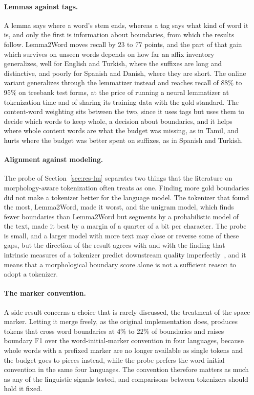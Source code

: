 \paragraph{Lemmas against tags.}
A lemma says where a word's stem ends, whereas a tag says what kind of word it is, and only the first is information about boundaries, from which the results follow.
Lemma2Word moves recall by 23 to 77 points, and the part of that gain which survives on unseen words depends on how far an affix inventory generalizes, well for English and Turkish, where the suffixes are long and distinctive, and poorly for Spanish and Danish, where they are short.
The online variant generalizes through the lemmatizer instead and reaches recall of 88\% to 95\% on treebank test forms, at the price of running a neural lemmatizer at tokenization time and of sharing its training data with the gold standard.
The content-word weighting sits between the two, since it uses tags but uses them to decide which words to keep whole, a decision about boundaries, and it helps where whole content words are what the budget was missing, as in Tamil, and hurts where the budget was better spent on suffixes, as in Spanish and Turkish.

\paragraph{Alignment against modeling.}
The probe of Section~\ref{sec:res-lm} separates two things that the literature on morphology-aware tokenization often treats as one.
Finding more gold boundaries did not make a tokenizer better for the language model. The tokenizer that found the most, Lemma2Word, made it worst, and the unigram model, which finds fewer boundaries than Lemma2Word but segments by a probabilistic model of the text, made it best by a margin of a quarter of a bit per character.
The probe is small, and a larger model with more text may close or reverse some of these gaps, but the direction of the result agrees with \citet{bostrom2020bpe} and with the finding that intrinsic measures of a tokenizer predict downstream quality imperfectly~\cite{schmidt2024tokenization,ali2024tokenizer}, and it means that a morphological boundary score alone is not a sufficient reason to adopt a tokenizer.

\paragraph{The marker convention.}
A side result concerns a choice that is rarely discussed, the treatment of the space marker.
Letting it merge freely, as the original implementation does, produces tokens that cross word boundaries at 4\% to 22\% of boundaries and raises boundary F1 over the word-initial-marker convention in four languages, because whole words with a prefixed marker are no longer available as single tokens and the budget goes to pieces instead, while the probe prefers the word-initial convention in the same four languages.
The convention therefore matters as much as any of the linguistic signals tested, and comparisons between tokenizers should hold it fixed.

